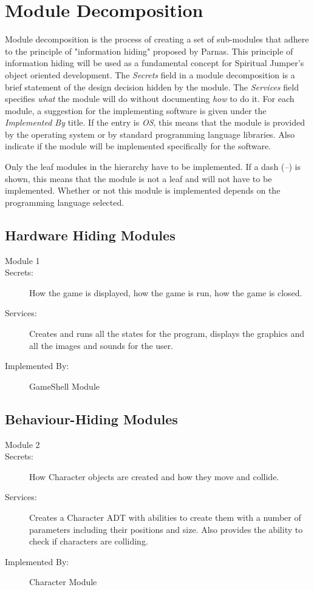 \documentclass[12pt, titlepage]{article}
\begin{document}
\section{Module Decomposition} \label{SecMD}

Module decomposition is the process of creating a set of sub-modules that adhere to the principle of  "information hiding" proposed by Parnas. This principle of information hiding will be used as a fundamental concept for Spiritual Jumper's object oriented development.
The \emph{Secrets} field in a module
decomposition is a brief statement of the design decision hidden by the
module. The \emph{Services} field specifies \emph{what} the module will do
without documenting \emph{how} to do it. For each module, a suggestion for the
implementing software is given under the \emph{Implemented By} title. If the
entry is \emph{OS}, this means that the module is provided by the operating
system or by standard programming language libraries.  Also indicate if the
module will be implemented specifically for the software.

Only the leaf modules in the
hierarchy have to be implemented. If a dash (\emph{--}) is shown, this means
that the module is not a leaf and will not have to be implemented. Whether or
not this module is implemented depends on the programming language
selected.



\subsection{Hardware Hiding Modules }

\begin{description}


\item[Module 1]
\item[Secrets:]How the game is displayed, how the game is run, how the game is closed.
\item[Services:]Creates and runs all the states for the program, displays the graphics and all the images and sounds for the user.
\item[Implemented By:] GameShell Module
\end{description}

\subsection{Behaviour-Hiding Modules}

\begin{description}
\item[Module 2]
\item[Secrets:]How Character objects are created and how they move and collide.
\item[Services:]Creates a Character ADT with abilities to create them with a number of parameters including their positions and size. Also provides the ability to check if characters are colliding.
\item[Implemented By:] Character Module
\end{description}
\end{document}
